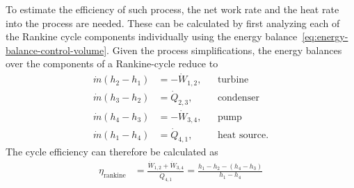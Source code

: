 To estimate the efficiency of such process, the net work rate and the heat rate into the process are needed. These can be calculated by first analyzing each of the Rankine cycle components individually using the energy balance~\eqref{eq:energy-balance-control-volume}. Given the process simplifications, the energy balances over the components of a Rankine-cycle reduce to
\begin{align}
    \dot{m}(h_2-h_1)&=-\dot{W}_{1,2}, & &\text{turbine}\\
    \dot{m}(h_3-h_2)&=\dot{Q}_{2,3}, & &\text{condenser}\\
    \dot{m}(h_4-h_3)&=-\dot{W}_{3,4}, & &\text{pump}\\
    \dot{m}(h_1-h_4)&=\dot{Q}_{4,1}, & &\text{heat source}.
\end{align}
The cycle efficiency can therefore be calculated as
\begin{align}
    \eta_{\text{rankine}}&=\frac{\dot{W}_{1,2}+\dot{W}_{3,4}}{\dot{Q}_{4,1}}=\frac{h_1-h_2-(h_4-h_3)}{h_1-h_4}
\end{align}
